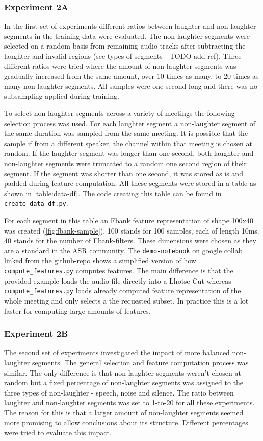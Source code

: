 \documentclass[bsc,frontabs,parskip,deptreport]{infthesis}
\newcommand{\coderepo}{\href{https://github.com/LasseWolter/laughter-detection-icsi}{github-repo} }
\begin{document}
\subsubsection{Experiment 2A}
In the first set of experiments different ratios between laughter and non-laughter segments in the training data were evaluated. 
The non-laughter segments were selected on a random basis from remaining audio tracks after subtracting the laughter and invalid regions (see types of segments - TODO add ref). 
Three different ratios were tried where the amount of non-laughter segments was gradually increased from the same amount, over 10 times as many, to 20 times as many non-laughter segments.
All samples were one second long and there was no subsampling applied during training.

To select non-laughter segments across a variety of meetings the following selection process was used.
For each laughter segment a non-laughter segment of the same duration was sampled from the same meeting. It is possible that the sample if from a different speaker, the channel within that meeting is chosen at random.
If the laughter segment was longer than one second, both laughter and non-laughter segments were truncated to a random one second region of their segment. 
If the segment was shorter than one second, it was stored as is and padded during feature computation.
All these segments were stored in a table as shown in \ref{table:data-df}.
The code creating this table can be found in \verb|create_data_df.py|. 

For each segment in this table an Fbank feature representation of shape 100x40 was created (\ref{fig:fbank-sample}). 100 stands for 100 samples, each of length 10ms. 40 stands for the number of Fbank-filters. These dimensions were chosen as they are a standard in the ASR community.
The \texttt{demo-notebook} on google collab linked from the \coderepo shows a simplified version of how \verb|compute_features.py| computes features. 
The main difference is that the provided example loads the audio file directly into a Lhotse Cut whereas \verb|compute_features.py| loads already computed feature representation of the whole meeting and only selects a the requested subset. In practice this is a lot faster for computing large amounts of features.

\subsubsection{Experiment 2B}
The second set of experiments investigated the impact of more balanced non-laughter segments. The general selection and feature computation process was similar. The only difference is that non-laughter segments weren't chosen at random but a fixed percentage of non-laughter segments was assigned to the three types of non-laughter - speech, noise and silence.
The ratio between laughter and non-laughter segments was set to 1-to-20 for all these experiments. The reason for this is that a larger amount of non-laughter segments seemed more promising to allow conclusions about its structure. 
Different percentages were tried to evaluate this impact.
\end{document}
